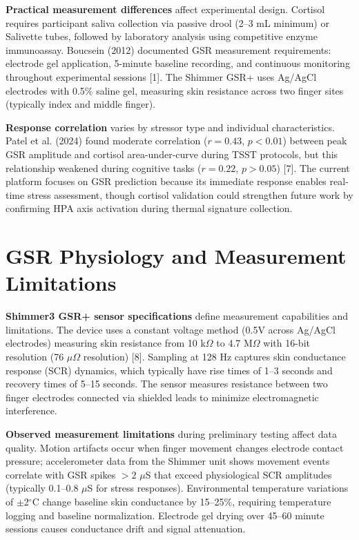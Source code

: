 \textbf{Practical measurement differences} affect experimental design. Cortisol requires participant saliva collection via passive drool (2--3 mL minimum) or Salivette tubes, followed by laboratory analysis using competitive enzyme immunoassay. Boucsein (2012) documented GSR measurement requirements: electrode gel application, 5-minute baseline recording, and continuous monitoring throughout experimental sessions [1]. The Shimmer GSR+ uses Ag/AgCl electrodes with 0.5\% saline gel, measuring skin resistance across two finger sites (typically index and middle finger).

\textbf{Response correlation} varies by stressor type and individual characteristics. Patel et al. (2024) found moderate correlation ($r = 0.43$, $p < 0.01$) between peak GSR amplitude and cortisol area-under-curve during TSST protocols, but this relationship weakened during cognitive tasks ($r = 0.22$, $p > 0.05$) [7]. The current platform focuses on GSR prediction because its immediate response enables real-time stress assessment, though cortisol validation could strengthen future work by confirming HPA axis activation during thermal signature collection.

\section{GSR Physiology and Measurement Limitations}
\textbf{Shimmer3 GSR+ sensor specifications} define measurement capabilities and limitations. The device uses a constant voltage method (0.5V across Ag/AgCl electrodes) measuring skin resistance from 10 k$\Omega$ to 4.7 M$\Omega$ with 16-bit resolution (76 $\mu\Omega$ resolution) [8]. Sampling at 128 Hz captures skin conductance response (SCR) dynamics, which typically have rise times of 1--3 seconds and recovery times of 5--15 seconds. The sensor measures resistance between two finger electrodes connected via shielded leads to minimize electromagnetic interference.

\textbf{Observed measurement limitations} during preliminary testing affect data quality. Motion artifacts occur when finger movement changes electrode contact pressure; accelerometer data from the Shimmer unit shows movement events correlate with GSR spikes $>2$ $\mu$S that exceed physiological SCR amplitudes (typically 0.1--0.8 $\mu$S for stress responses). Environmental temperature variations of $\pm$2$^\circ$C change baseline skin conductance by 15--25\%, requiring temperature logging and baseline normalization. Electrode gel drying over 45--60 minute sessions causes conductance drift and signal attenuation.

